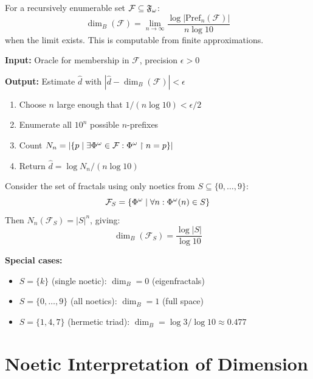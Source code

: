 \begin{proposition}
\label{prop:computational-box}
For a recursively enumerable set $\mathcal{F} \subseteq \mathfrak{F}_\omega$:
\[
\dim_B(\mathcal{F}) = \lim_{n \to \infty} \frac{\log |\mathrm{Pref}_n(\mathcal{F})|}{n \log 10}
\]
when the limit exists. This is computable from finite approximations.
\end{proposition}

\begin{algorithm}
\label{alg:box-dim}
\textbf{Input:} Oracle for membership in $\mathcal{F}$, precision $\epsilon > 0$

\textbf{Output:} Estimate $\hat{d}$ with $|\hat{d} - \dim_B(\mathcal{F})| < \epsilon$

\begin{enumerate}
  \item Choose $n$ large enough that $1/(n \log 10) < \epsilon/2$
  \item Enumerate all $10^n$ possible $n$-prefixes
  \item Count $N_n = |\{p \mid \exists \Phi^{\omega} \in \mathcal{F} : \Phi^{\omega} \restriction n = p\}|$
  \item Return $\hat{d} = \log N_n / (n \log 10)$
\end{enumerate}
\end{algorithm}

\begin{example}
\label{ex:restricted-box-dim}
Consider the set of fractals using only noetics from $S \subseteq \{0, \ldots, 9\}$:
\[
\mathcal{F}_S = \{\Phi^{\omega} \mid \forall n : \Phi^{\omega}(n) \in S\}
\]
Then $N_n(\mathcal{F}_S) = |S|^n$, giving:
\[
\dim_B(\mathcal{F}_S) = \frac{\log |S|}{\log 10}
\]

\textbf{Special cases:}
\begin{itemize}
  \item $S = \{k\}$ (single noetic): $\dim_B = 0$ (eigenfractals)
  \item $S = \{0, \ldots, 9\}$ (all noetics): $\dim_B = 1$ (full space)
  \item $S = \{1, 4, 7\}$ (hermetic triad): $\dim_B = \log 3 / \log 10 \approx 0.477$
\end{itemize}
\end{example}

\section{Noetic Interpretation of Dimension}
\label{sec:noetic-dimension-interpretation}

